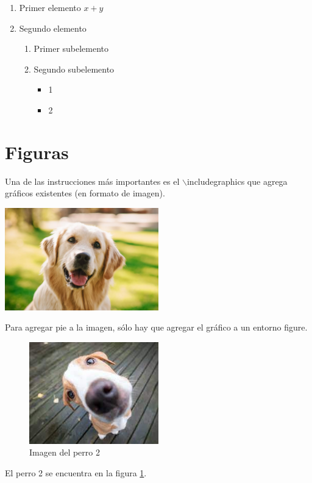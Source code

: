 \documentclass[]{article}
\begin{document}
\begin{enumerate}
	\item Primer elemento $x+y$
	\item Segundo elemento
	\begin{enumerate}
		\item Primer subelemento
		\item Segundo subelemento
		\begin{itemize}
			\item 1
			\item 2
		\end{itemize}
	\end{enumerate}
\end{enumerate}

\section{Figuras}
Una de las instrucciones más importantes es el $\backslash$includegraphics que agrega gráficos existentes (en formato de imagen).

\includegraphics[width = 0.5\textwidth ]{perro1.jpg}

Para agregar pie a la imagen, sólo hay que agregar el gráfico a un entorno figure.

\begin{figure}
	\centering
	\includegraphics[width = 0.5\textwidth ]{perro2.jpg}
	\caption{Imagen del perro 2}
	\label{fig:perro2}
\end{figure}

El perro 2 se encuentra en la figura \ref{fig:perro2}.
\end{document}

